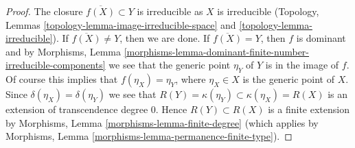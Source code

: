 \documentclass[10pt,a4paper]{amsart}
\theoremstyle{plain}
\theoremstyle{definition}
\theoremstyle{remark}
\numberwithin{equation}{subsection}
\begin{document}
\begin{proof}
The closure $\overline{f(X)} \subset Y$ is irreducible as $X$
is irreducible (Topology, Lemmas
\ref{topology-lemma-image-irreducible-space} and
\ref{topology-lemma-irreducible}).
If $\overline{f(X)} \not = Y$, then we are done.
If $\overline{f(X)} = Y$, then $f$ is dominant and by
Morphisms,
Lemma \ref{morphisms-lemma-dominant-finite-number-irreducible-components}
we see that the generic point $\eta_Y$ of $Y$ is in the image of $f$.
Of course this implies that $f(\eta_X) = \eta_Y$, where $\eta_X \in X$
is the generic point of $X$. Since $\delta(\eta_X) = \delta(\eta_Y)$
we see that $R(Y) = \kappa(\eta_Y) \subset \kappa(\eta_X) = R(X)$
is an extension of transcendence degree $0$.
Hence $R(Y) \subset R(X)$ is a finite extension by
Morphisms, Lemma \ref{morphisms-lemma-finite-degree}
(which applies by
Morphisms, Lemma \ref{morphisms-lemma-permanence-finite-type}).
\end{proof}
\end{document}
